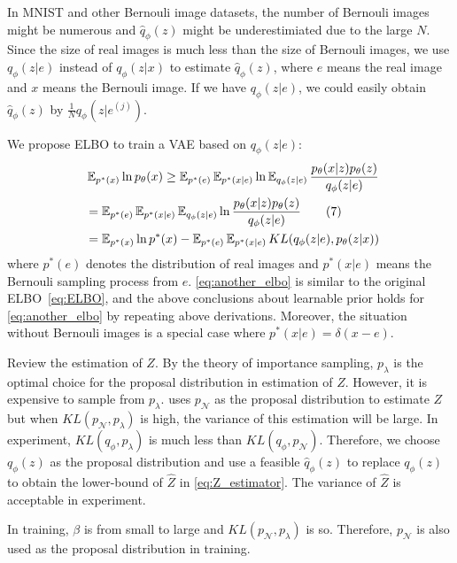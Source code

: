 In MNIST and other Bernouli image datasets, the number of Bernouli images might be numerous and $\hat{q}_\phi(z)$ might be underestimiated due to the large $N$. 
Since the size of real images is much less than the size of Bernouli images, we use $q_\phi(z|e)$ instead of $q_\phi(z|x)$ to estimate $\hat{q}_\phi(z)$, where $e$ means the real image and $x$ means the Bernouli image. If we have $q_\phi(z|e)$, we could easily obtain $\hat{q}_\phi(z)$ by $\frac{1}{N} q_\phi(z|e^{(j)})$. 

We propose ELBO to train a VAE based on $q_\phi(z|e)$:
\begin{align*}~\label{eq:another_elbo}
	&\operatorname{\mathbb{E}}_{p^*(x)} \ln p_\theta(x) \geq \operatorname{\mathbb{E}}_{p^*(e)} \operatorname{\mathbb{E}}_{p^*(x|e)} \ln \operatorname{\mathbb{E}}_{q_\phi(z|e)} \frac{p_\theta(x|z)p_\theta(z)}{q_\phi(z|e)} \\
	 &= \operatorname{\mathbb{E}}_{p^*(e)} \operatorname{\mathbb{E}}_{p^*(x|e)} \operatorname{\mathbb{E}}_{q_\phi(z|e)} \ln \frac{p_\theta(x|z)p_\theta(z)}{q_\phi(z|e)} \tag{7} \\
	 &= \operatorname{\mathbb{E}}_{p^*(x)} \ln p^*(x) - \operatorname{\mathbb{E}}_{p^*(e)} \operatorname{\mathbb{E}}_{p^*(x|e)} KL(q_\phi(z|e), p_\theta(z|x))
\end{align*} 
where $p^*(e)$ denotes the distribution of real images and $p^*(x|e)$ means the Bernouli sampling process from $e$. 
\cref{eq:another_elbo} is similar to the original ELBO~\cref{eq:ELBO}, and the above conclusions about learnable prior holds for \cref{eq:another_elbo} by repeating above derivations. Moreover, the situation without Bernouli images is a special case where $p^*(x|e) = \delta(x - e)$. %

Review the estimation of $Z$. By the theory of importance sampling, $p_\lambda$ is the optimal choice for the proposal distribution in estimation of $Z$. However, it is expensive to sample from $p_\lambda$. 
\cite{bauer2019resampled} uses $p_\mathcal{N}$ as the proposal distribution to estimate $Z$ but when $KL(p_\mathcal{N}, p_\lambda)$ is high, the variance of this estimation will be large. In experiment, $KL(q_\phi, p_\lambda)$ is much less than $KL(q_\phi, p_\mathcal{N})$. Therefore, we choose $q_\phi(z)$ as the proposal distribution and use a feasible $\hat{q}_\phi(z)$ to replace $q_\phi(z)$ to obtain the lower-bound of $\hat{Z}$ in \cref{eq:Z_estimator}. The variance of $\hat{Z}$ is acceptable in experiment.  

In training, $\beta$ is from small to large and $KL(p_\mathcal{N}, p_\lambda)$ is so. Therefore, $p_\mathcal{N}$ is also used as the proposal distribution in training. 